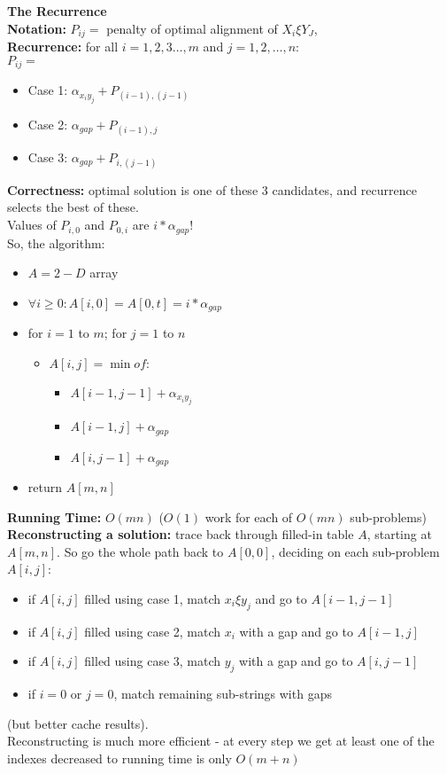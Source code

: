 \documentclass{scrartcl}
\begin{document}
{\bf The Recurrence}\\
{\bf Notation: } $P_{ij} = $ penalty of optimal alignment of $X_i \xi Y_J$,\\
{\bf Recurrence: } for all $i = 1, 2, 3\dots, m$ and $j = 1, 2, \dots, n$: \\
$P_{ij} = $
\begin{itemize}
\item Case 1: $\alpha_{x_iy_j} + P_{(i-1), (j-1)}$
\item Case 2: $\alpha_{gap} + P_{(i-1), j}$
\item Case 3: $\alpha_{gap} + P_{i, (j-1)}$
\end{itemize}
{\bf Correctness: } optimal solution is one of these 3 candidates, and
recurrence selects the best of these.\\
Values of $P_{i, 0}$ and $P_{0, i}$ are $i * \alpha_{gap}$!\\

So, the algorithm:
\begin{itemize}
\item $A = 2-D$ array
\item $\forall i \geq 0:A[i, 0] = A[0,t] = i * \alpha_{gap}$
\item for $i = 1$ to $m$; for $j=1$ to $n$
  \begin{itemize}
  \item $A[i, j] = \min of: $
    \begin{itemize}
    \item $A[i-1, j-1] + \alpha_{x_iy_j}$
    \item $A[i-1, j] + \alpha_{gap}$
    \item $A[i, j-1] + \alpha_{gap}$
    \end{itemize}
  \end{itemize}
\item return $A[m,n]$
\end{itemize}

{\bf Running Time: } $O(mn)$ ($O(1)$ work for each of $O(mn)$ sub-problems)\\

{\bf Reconstructing a solution: } trace back through filled-in table $A$,
starting at $A[m, n]$. So go the whole path back to $A[0,0]$, deciding on each
sub-problem $A[i, j]$:
\begin{itemize}
\item if $A[i,j]$ filled using case 1, match $x_i \xi y_j$ and go to $A[i-1,
  j-1]$
\item if $A[i,j]$ filled using case 2, match $x_i$ with a gap and go to $A[i-1,
  j]$
\item if $A[i,j]$ filled using case 3, match $y_j$ with a gap and go to $A[i,
  j-1]$
\item if $i=0$ or $j=0$, match remaining sub-strings with gaps
\end{itemize}
(but better cache results).\\
Reconstructing is much more efficient - at every step we get at least one of the
indexes decreased to running time is only $O(m+n)$
\end{document}
